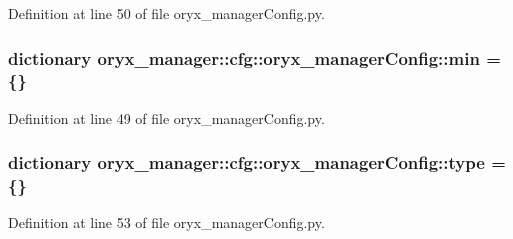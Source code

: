 \-Definition at line 50 of file oryx\-\_\-manager\-Config.\-py.

\subsubsection[{min}]{\setlength{\rightskip}{0pt plus 5cm}dictionary {\bf oryx\-\_\-manager\-::cfg\-::oryx\-\_\-manager\-Config\-::min} = \{\}}\label{namespaceoryx__manager_1_1cfg_1_1oryx__managerConfig_ad6545354d7bbb92958b924b8d4b09085}


\-Definition at line 49 of file oryx\-\_\-manager\-Config.\-py.

\subsubsection[{type}]{\setlength{\rightskip}{0pt plus 5cm}dictionary {\bf oryx\-\_\-manager\-::cfg\-::oryx\-\_\-manager\-Config\-::type} = \{\}}\label{namespaceoryx__manager_1_1cfg_1_1oryx__managerConfig_a0d3441f3dcb9f542eca9ee87f2db65f7}


\-Definition at line 53 of file oryx\-\_\-manager\-Config.\-py.

